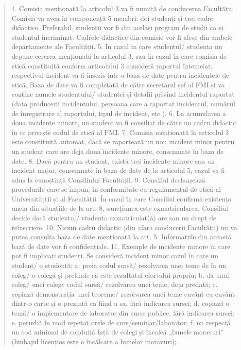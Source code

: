 \documentclass{article}
\begin{document}
\begin{quote}
4. Comisia menționată la articolul 3 va fi numită de conducerea Facultății. Comisia va
avea în componență 5 membri: doi studenți și trei cadre didactice. Preferabil,
studenții vor fi din același program de studii ca și studentul incriminat. Cadrele
didactice din comisie vor fi alese din ambele departamente ale Facultății.
5. In cazul in care studentul/ studenta nu depune cererea menționată la articolul 3, sau
în cazul în care comisia de etică constituită conform articolului 3 consideră raportul
întemeiat, respectivul incident va fi înscris într-o bază de date pentru incidentele de
etică. Baza de date va fi completată de către secretarul șef al FMI și va conține
numele studentului/ studentei și detalii privind incidentul raportat (data producerii
incidentului, persoana care a raportat incidentul, numărul de înregistrare al raportului,
tipul de incident, etc.).
6. La acumularea a doua incidente minore, un student va fi consiliat de către un cadru
didactic în ce privește codul de etică al FMI.
7. Comisia menționată la articolul 3 este constituită automat, dacă se raportează un nou
incident minor pentru un student care are deja doua incidente minore, consemnate în
baza de date.
8. Dacă pentru un student, există trei incidente minore sau un incident major,
consemnate în baza de date de la articolul 5, cazul va fi adus la cunoștință Consiliului
Facultății.
9. Consiliul declanșează procedurile care se impun, în conformitate cu regulamentul de
etică al Universitățtii și al Facultății. În cazul în care Consiliul confirmă existența uneia
din situațiile de la art. 8, sancțiunea este exmatricularea. Consiliul decide dacă
studentul/ studenta exmatriculat(ă) are sau nu drept de reînscriere.
10. Niciun cadru didactic (din afara conducerii Facultății) nu va putea consulta baza de
date menționată la art. 5. Informațiile din această bază de date vor fi confidențiale.
11. Exemple de incidente minore în care pot fi implicați studenți.
Se consideră incident minor cazul în care un student/ o studentă:
a. preia codul sursă/ rezolvarea unei teme de la un coleg/ o colegă și pretinde că este
rezultatul efortului propriu;
b. dă unui coleg/ unei colege codul sursă/ rezolvarea unei teme, deja predată;
c. copiază demonstrația unei teoreme/ rezolvarea unei teme cuvânt-cu-cuvânt dintr-o
carte și o prezintă ca fiind a sa, fără indicarea sursei;
d. copiază o temă/ o implementare de laborator din surse publice, fără indicarea sursei;
e. perurbă în mod repetat orele de curs/seminar/laborator;
f. nu respectă un cod minimal de conduită față de colegi și încalcă „bunele moravuri”
(limbajul licențios este o încălcare a bunelor moravuri);

\end{quote}
\end{document}
